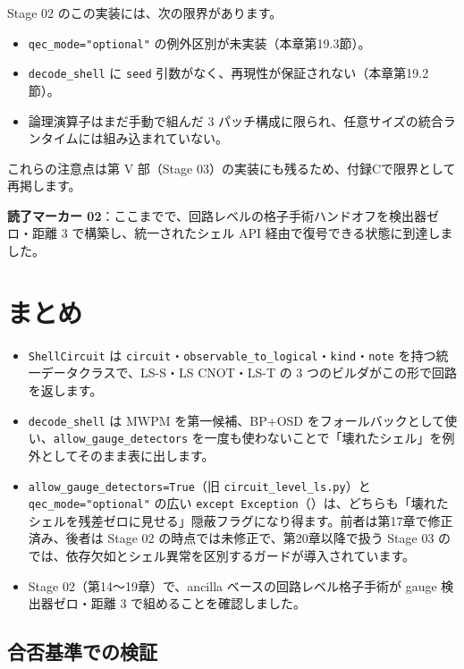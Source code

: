 Stage 02 のこの実装には、次の限界があります。

\begin{itemize}
  \item \texttt{qec\_mode="optional"} の例外区別が未実装（本章第19.3節）。
  \item \texttt{decode\_shell} に \texttt{seed} 引数がなく、再現性が保証されない（本章第19.2節）。
  \item 論理演算子はまだ手動で組んだ 3 パッチ構成に限られ、任意サイズの統合ランタイムには組み込まれていない。
\end{itemize}

これらの注意点は第 V 部（Stage 03）の実装にも残るため、付録Cで限界として再掲します。

\textbf{読了マーカー 02}：ここまでで、回路レベルの格子手術ハンドオフを検出器ゼロ・距離 3 で構築し、統一されたシェル API 経由で復号できる状態に到達しました。

\section{まとめ}\label{ch19:summary}

\begin{itemize}
  \item \texttt{ShellCircuit} は \texttt{circuit}・\texttt{observable\_to\_logical}・\texttt{kind}・\texttt{note} を持つ統一データクラスで、LS-S・LS CNOT・LS-T の 3 つのビルダがこの形で回路を返します。
  \item \texttt{decode\_shell} は MWPM を第一候補、BP+OSD をフォールバックとして使い、\texttt{allow\_gauge\_detectors} を一度も使わないことで「壊れたシェル」を例外としてそのまま表に出します。
  \item \texttt{allow\_gauge\_detectors=True}（旧 \texttt{circuit\_level\_ls.py}）と \texttt{qec\_mode="optional"} の広い \texttt{except Exception}（）は、どちらも「壊れたシェルを残差ゼロに見せる」隠蔽フラグになり得ます。前者は第17章で修正済み、後者は Stage 02 の時点では未修正で、第20章以降で扱う Stage 03 の  では、依存欠如とシェル異常を区別するガードが導入されています。
  \item Stage 02（第14〜19章）で、ancilla ベースの回路レベル格子手術が gauge 検出器ゼロ・距離 3 で組めることを確認しました。
\end{itemize}

\subsection*{合否基準での検証}

